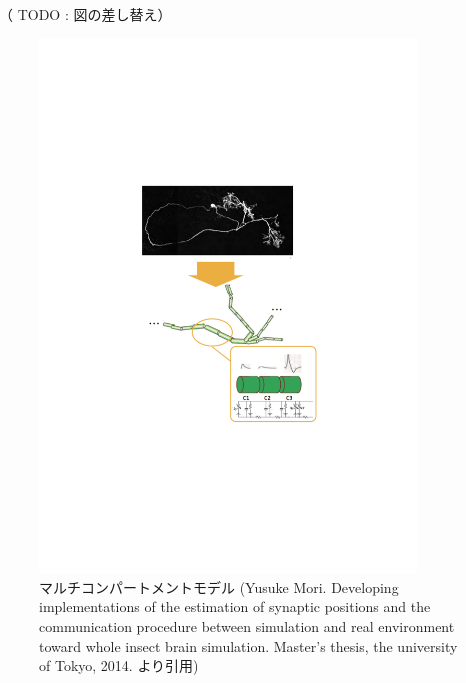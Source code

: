 （ TODO : 図の差し替え）
\begin{figure}[htb]
 \begin{center}
    \includegraphics[width=10cm]{./images/multi-compartment.pdf}
    \caption{マルチコンパートメントモデル (Yusuke Mori. Developing implementations of the estimation of synaptic positions and the communication procedure between simulation and real environment toward whole insect brain simulation. Master's thesis, the university of Tokyo, 2014. より引用)}
    \label{fig:multi-compartment}
 \end{center}
\end{figure}
\clearpage
